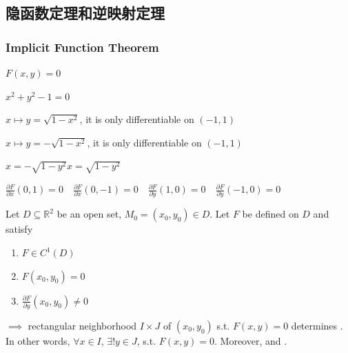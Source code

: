 \subsection{隐函数定理和逆映射定理}
\subsubsection[隐函数的存在性和微商]{Implicit Function Theorem}

\begin{example}
    $F(x,y)=0$

    $x^2+y^2-1=0$

    $x\mapsto y=\sqrt{1-x^2}$, it is only differentiable on $(-1,1)$

    $x\mapsto y=-\sqrt{1-x^2}$, it is only differentiable on $(-1,1)$

    $x=-\sqrt{1-y^2}$\quad$x=\sqrt{1-y^2}$

    $\frac{\partial F}{\partial x}(0,1)=0\quad\frac{\partial F}{\partial x}(0,-1)=0\quad\frac{\partial F}{\partial y}(1,0)=0\quad\frac{\partial F}{\partial y}(-1,0)=0$
\end{example}

\begin{theorem}
    Let $D\subseteq\mathbb{R}^2$ be an open set, $M_0=(x_0,y_0)\in D$. Let $F$ be defined on $D$ and satisfy\begin{enumerate}
        \item $F\in C^1(D)$ 
        \item $F(x_0,y_0)=0$
        \item $\frac{\partial F}{\partial y}(x_0,y_0)\neq 0$
    \end{enumerate}
    $\implies$ rectangular neighborhood $I\times J$ of $(x_0,y_0)$ s.t. $F(x,y)=0$ determines . In other words, $\forall x\in I$, $\exists!y\in J$, s.t. $F(x,y)=0$. Moreover,  and .
\end{theorem}

